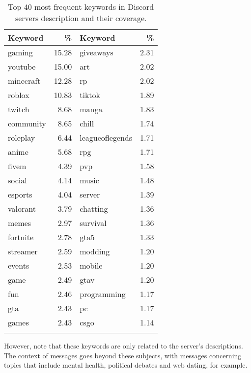 \begin{table}[t]
\caption{Top 40 most frequent keywords in Discord servers description and their coverage.}
\centering
\begin{tabular}{lr|lr}
\hline
\textbf{Keyword} & \textbf{\%} & \textbf{Keyword} & \textbf{\%} \\
\hline
gaming & 15.28 & giveaways & 2.31 \\
youtube & 15.00 & art & 2.02 \\
minecraft & 12.28 & rp & 2.02 \\
roblox & 10.83 & tiktok & 1.89 \\
twitch & 8.68 & manga & 1.83 \\
community & 8.65 & chill & 1.74 \\
roleplay & 6.44 & leagueoflegends & 1.71 \\
anime & 5.68 & rpg & 1.71 \\
fivem & 4.39 & pvp & 1.58 \\
social & 4.14 & music & 1.48 \\
esports & 4.04 & server & 1.39 \\
valorant & 3.79 & chatting & 1.36 \\
memes & 2.97 & survival & 1.36 \\
fortnite & 2.78 & gta5 & 1.33 \\
streamer & 2.59 & modding & 1.20 \\
events & 2.53 & mobile & 1.20 \\
game & 2.49 & gtav & 1.20 \\
fun & 2.46 & programming & 1.17 \\
gta & 2.43 & pc & 1.17 \\
games & 2.43 & csgo & 1.14 \\
\hline
\label{tab:top_40_keywords}
\end{tabular}
\end{table}

However, note that these keywords are only related to the server's descriptions. The context of messages goes beyond these subjects, with messages concerning topics that include mental health, political debates and web dating, for example. 